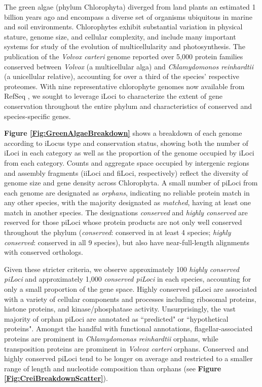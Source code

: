 The green algae (phylum Chlorophyta) diverged from land plants an estimated 1 billion years ago \cite{Merchant245} and encompass a diverse set of organisms ubiquitous in marine and soil environments.
Chlorophytes exhibit substantial variation in physical stature, genome size, and cellular complexity, and include many important systems for study of the evolution of multicellularity and photosynthesis.
The publication of the \textit{Volvox carteri} genome \cite{VolvoxGenome} reported over 5,000 protein families conserved between \textit{Volvox} (a multicellular alga) and \textit{Chlamydomonos reinhardtii} (a unicellular relative), accounting for over a third of the  species' respective proteomes.
With nine representative chlorophyte genomes now available from RefSeq \cite{RefSeq}, we sought to leverage iLoci to characterize the extent of gene conservation throughout the entire phylum and characteristics of conserved and species-specific genes.

\textbf{Figure \ref{Fig:GreenAlgaeBreakdown}} shows a breakdown of each genome according to iLocus type and conservation status, showing both the number of iLoci in each category as well as the proportion of the genome occupied by iLoci from each category.
Counts and aggregate space occupied by intergenic regions and assembly fragments (iiLoci and fiLoci, respectively) reflect the diversity of genome size and gene density across Chlorophyta.
A small number of piLoci from each genome are designated as \textit{orphans}, indicating no reliable protein match in any other species, with the majority designated as \textit{matched}, having at least one match in another species.
The designations \textit{conserved} and \textit{highly conserved} are reserved for those piLoci whose protein products are not only well conserved throughout the phylum (\textit{conserved}: conserved in at least 4 species; \textit{highly conserved}: conserved in all 9 species), but also have near-full-length alignments with conserved orthologs.

Given these stricter criteria, we observe approximately 100 \textit{highly conserved piLoci} and approximately 1,000 \textit{conserved piLoci} in each species, accounting for only a small proportion of the gene space.
Highly conserved piLoci are associated with a variety of cellular components and processes including ribosomal proteins, histone proteins, and kinase/phosphatase activity.
Unsurprisingly, the vast majority of orphan piLoci are annotated as ``predicted" or ``hypothetical proteins".
Amongst the handful with functional annotations, flagellar-associated proteins are prominent in \textit{Chlamydomonas reinhardtii} orphans, while transposition proteins are prominent in \textit{Volvox carteri} orphans.
Conserved and highly conserved piLoci tend to be longer on average and restricted to a smaller range of length and nucleotide composition than orphans (see \textbf{Figure \ref{Fig:CreiBreakdownScatter}}).









